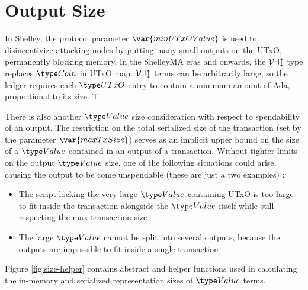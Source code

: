 \section{Output Size}
\label{sec:value-size}

In Shelley, the protocol parameter $\var{minUTxOValue}$ is used to
disincentivize attacking nodes by putting many small outputs on the
UTxO, permanently blocking memory. In the ShelleyMA eras
and onwards, the $\mathcal{Val}$ type replaces $\Coin$ in UTxO map. $\mathcal{Val}$ terms
can be arbitrarily large, so the ledger requires each $\UTxO$ entry to
contain a minimum amount of Ada, proportional to its size. T

There is also another $\Value$ size consideration with respect to spendability
of an output. The restriction on the total serialized size of the transaction (set
by the parameter $\var{maxTxSize}$) serves as an implicit upper bound on the
size of a $\Value$ contained in an output of a transaction. Without tighter
limits on the output $\Value$ size, one of the following situations could arise,
causing the output to be come unspendable (these are just a two examples) :

\begin{itemize}
  \item The script locking the very large $\Value$-containing UTxO is too large
  to fit inside the transaction alongside the $\Value$ itself while still respecting
  the max transaction size
  \item The large $\Value$ cannot be split into several outputs, because the
  outputs are impossible to fit inside a single transaction
\end{itemize}

Figure \ref{fig:size-helper} contains abstract and helper functions
used in calculating the in-memory and serialized representation
sizes of $\Value$ terms.

